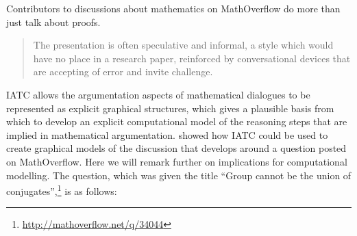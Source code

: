 \documentclass[smallextended,oneside]{svjour3}       %
\let\cite\citep
\newcommand\nothing[1]{#1}
\let\thesis\nothing
\let\paragraph\nothing
\begin{document}
Contributors to discussions about mathematics on MathOverflow do more than just talk about proofs.
\begin{quote}
The presentation is often speculative and informal, a style which
would have no place in a research paper, reinforced by conversational
devices that are accepting of error and invite
challenge. \cite{martin2013does}
\end{quote}





\paragraph{IATC allows the argumentation aspects of mathematical dialogues to be represented as explicit graphical structures, which gives a plausible basis from which to develop an explicit computational model of the reasoning steps that are implied in mathematical argumentation.}
\paragraph{\citet{corneli2017towards} showed how IATC could be used to create graphical models of the discussion that develops around a question posted on MathOverflow.  Here we will remark further on implications for computational modelling.
The question, which was given the title  ``Group cannot be the union of conjugates'',\footnote{\url{http://mathoverflow.net/q/34044}}} is as follows:
\end{document}
